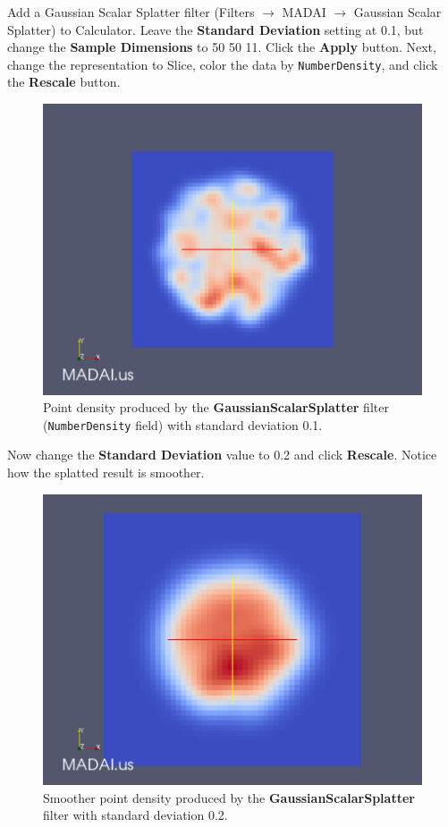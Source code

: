 \documentclass[12pt]{article}
\begin{document}
Add a Gaussian Scalar Splatter filter (Filters $\rightarrow$ MADAI $\rightarrow$ Gaussian Scalar Splatter) to Calculator. Leave the \textbf{Standard Deviation} setting at 0.1, but change the \textbf{Sample Dimensions} to 50 50 11. Click the \textbf{Apply} button. Next, change the representation to Slice, color the data by \texttt{NumberDensity}, and click the \textbf{Rescale} button.

\begin{figure}[htbp]
   \centering
   \includegraphics[scale=.25]{images/GaussianScalarSplatterPoint1.png} %
   \caption{Point density produced by the \textbf{GaussianScalarSplatter} filter (\texttt{NumberDensity} field) with standard deviation 0.1.}
   \label{fig:GaussianScalarSplatter1}
\end{figure}

Now change the \textbf{Standard Deviation} value to 0.2 and click \textbf{Rescale}. Notice how the splatted result is smoother.

\begin{figure}[htbp]
   \centering
   \includegraphics[scale=.25]{images/GaussianScalarSplatterPoint2.png} %
   \caption{Smoother point density produced by the \textbf{GaussianScalarSplatter} filter with standard deviation 0.2.}
   \label{fig:GaussianScalarSplatter2}
\end{figure}
\end{document}
